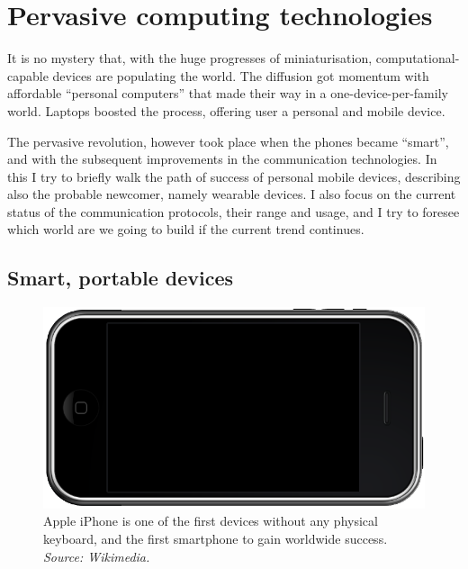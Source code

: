 \documentclass[12pt,a4paper,twoside,openright]{book}
\begin{document}
\chapter{Pervasive computing technologies}
\label{pervasive-devices}

It is no mystery that, with the huge progresses of miniaturisation, computational-capable devices are populating the world.
%
The diffusion got momentum with affordable ``personal computers'' that made their way in a one-device-per-family world.
%
Laptops boosted the process, offering user a personal and mobile device.

The pervasive revolution, however took place when the phones became ``smart'', and with the subsequent improvements in the communication technologies.
%
In this\levelText{} I try to briefly walk the path of success of personal mobile devices, describing also the probable newcomer, namely wearable devices.
%
I also focus on the current status of the communication protocols, their range and usage, and I try to foresee which world are we going to build if the current trend continues.

\section{Smart, portable devices}

\begin{figure}
	\centering
	\includegraphics[width=\textwidth]{img/iphone}
	\caption[Apple iPhone]{Apple iPhone is one of the first devices without any physical keyboard, and the first smartphone to gain worldwide success. \emph{Source: Wikimedia.}}
	\label{img:iphone}
\end{figure}
\end{document}
